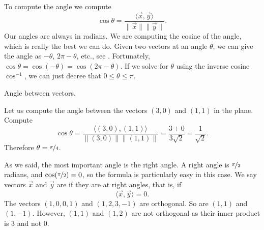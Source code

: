 %

To compute the angle we compute
\begin{equation*}
\cos \theta
=
\frac{\langle \vec{x}, \vec{y} \rangle}{\lVert{\vec{x}}\rVert
\lVert{\vec{y}}\rVert} .
\end{equation*}
Our angles are always in radians.
We are computing the cosine of the angle,
which is really the best
we can do.  Given two vectors at an angle $\theta$, we can give the angle as
$-\theta$, $2\pi-\theta$, etc.,
see .
Fortunately,
$\cos \theta = \cos (-\theta) = \cos(2\pi - \theta)$.
If we solve for $\theta$ using the inverse cosine $\cos^{-1}$,
we can just decree that $0 \leq \theta \leq \pi$.

\begin{myfig}
\capstart
{}
\caption{Angle between vectors.\label{vec-angle:fig}}
\end{myfig}

\begin{example}
Let us compute the angle between the vectors $(3,0)$ and $(1,1)$ in the
plane.
Compute
\begin{equation*}
\cos \theta =
\frac{\bigl\langle (3,0) , (1,1) \bigr\rangle}{\lVert(3,0)\rVert \lVert(1,1)\rVert}
=
\frac{3 + 0}{3 \sqrt{2}} = \frac{1}{\sqrt{2}} .
\end{equation*}
Therefore $\theta = \nicefrac{\pi}{4}$.
\end{example}

%

As we said, the most important angle is the right angle.  A right angle
is $\nicefrac{\pi}{2}$ radians, and $\cos (\nicefrac{\pi}{2}) = 0$, so the
formula is particularly easy in this case.
We say
vectors $\vec{x}$ and $\vec{y}$
are \emph{} if they are at right
angles, that is, if
\begin{equation*}
\langle \vec{x} , \vec{y} \rangle
=
0 .
\end{equation*}
The vectors $(1,0,0,1)$ and $(1,2,3,-1)$ are orthogonal.  So
are $(1,1)$ and $(1,-1)$.  However, $(1,1)$ and $(1,2)$ are not orthogonal as
their inner product is $3$ and not 0.

